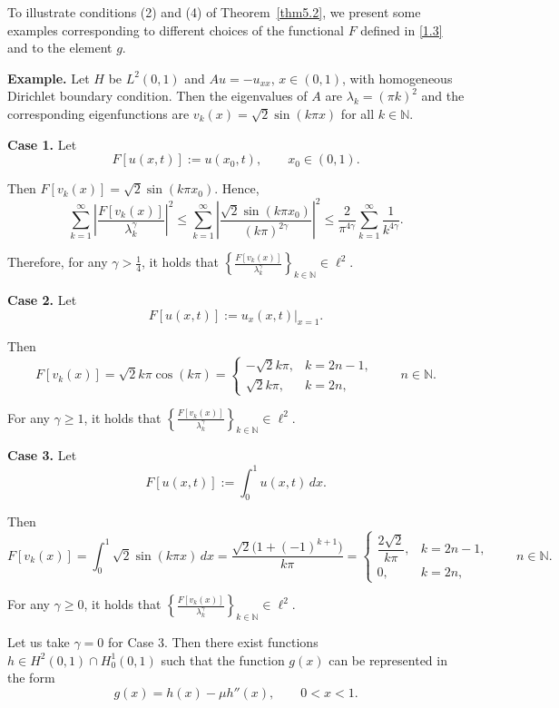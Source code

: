 \documentclass[reqno]{amsart}
\theoremstyle{definition}
\numberwithin{equation}{section}
\begin{document}
To illustrate conditions (2) and (4) of Theorem~\ref{thm5.2}, we present some examples corresponding to different choices of the functional $F$ defined in \eqref{1.3} and to the element $g$.

\medskip
\noindent \textbf{Example.} 
Let $H$ be $L^2(0,1)$ and $Au=-u_{x x}$, $ x \in(0,1)$, with homogeneous Dirichlet boundary condition. Then the eigenvalues of $A$ are $\lambda_k = (\pi k)^2$ and the corresponding eigenfunctions are $v_k(x) = \sqrt{2}\sin(k\pi x)$ for all $k \in \mathbb{N}$.

\medskip
\noindent \textbf{Case 1.}
Let 
$$
F[u(x,t)] := u(x_0,t), \qquad x_0\in(0,1).
$$

Then $F[v_k(x)]=\sqrt{2}\sin(k\pi x_0)$. Hence,
$$
\sum_{k=1}^{\infty}\left|\frac{F\left[v_k(x)\right]}{\lambda_k^\gamma}\right|^2 \leq \sum_{k=1}^{\infty}\left|\frac{\sqrt{2} \sin \left(k \pi x_0\right)}{(k \pi)^{2 \gamma}}\right|^2 \leq \frac{2}{\pi^{4 \gamma}} \sum_{k=1}^{\infty} \frac{1}{k^{4 \gamma}}.
$$

Therefore, for any \(\gamma>\frac14\), it holds that $\left\{\frac{F[v_k(x)]}{\lambda_k^\gamma}\right\}_{k\in\mathbb N}\in \ell^2$.

\medskip
\noindent \textbf{Case 2.}
Let
$$
F[u(x,t)] := {{\left. u_x(x,t) \right|}_{x=1}}.
$$

Then
$$
F[v_k(x)]=\sqrt{2}k\pi\cos(k\pi)=\begin{cases}
-\sqrt{2}k\pi, & k=2n-1,\\[2mm]
\sqrt{2}k\pi, & k=2n,
\end{cases}
\qquad n\in\mathbb N.
$$

For any $\gamma \ge1$, it holds that $\left\{\frac{F[v_k(x)]}{\lambda^{\gamma}_k}\right\}_{k\in\mathbb N}\in \ell^2$.

\medskip
\noindent \textbf{Case 3.} 
Let
$$
F[u(x,t)] := \int_0^1 u(x,t)\,dx.
$$

Then
$$
F[v_k(x)]
=\int_0^1 \sqrt{2}\sin(k\pi x)\,dx
=\frac{\sqrt{2}\bigl(1+(-1)^{k+1}\bigr)}{k\pi}
=
\begin{cases}
\dfrac{2\sqrt{2}}{k\pi}, & k=2n-1,\\[2mm]
0, & k=2n, 
\end{cases}
\qquad n\in\mathbb N.
$$

For any $\gamma \ge 0$, it holds that $\left\{\frac{F[v_k(x)]}{\lambda^{\gamma}_k}\right\}_{k\in\mathbb N}\in \ell^2$.

Let us take $\gamma=0$ for Case 3. Then there exist functions $h \in H^2(0,1) \cap H_0^1(0,1)$ such that the function $g(x)$ can be represented in the form
$$
    g(x)=h(x)-\mu h''(x), \qquad 0<x<1.
$$
\end{document}
